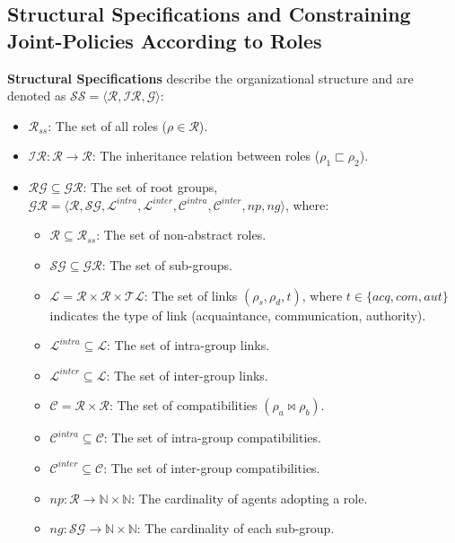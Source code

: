 \documentclass[conference]{IEEEtran}
\newcounter{relation}
\begin{document}
\subsection{Structural Specifications and Constraining Joint-Policies According to Roles}

\textbf{Structural Specifications} describe the organizational structure and are denoted as $\mathcal{SS} = \langle \mathcal{R}, \mathcal{IR}, \mathcal{G} \rangle$:

\begin{itemize}
    \item $\mathcal{R}_{ss}$: The set of all roles ($\rho \in \mathcal{R}$).
    \item $\mathcal{IR}: \mathcal{R} \rightarrow \mathcal{R}$: The inheritance relation between roles ($\rho_1 \sqsubset \rho_2$).
    \item $\mathcal{RG} \subseteq \mathcal{GR}$: The set of root groups, $\mathcal{GR} = \langle \mathcal{R}, \mathcal{SG}, \mathcal{L}^{intra}, \mathcal{L}^{inter}, \mathcal{C}^{intra}, \mathcal{C}^{inter}, \allowbreak np, ng \rangle$, where:
          \begin{itemize}
          \item $\mathcal{R} \subseteq \mathcal{R}_{ss}$: The set of non-abstract roles.
          \item $\mathcal{SG} \subseteq \mathcal{GR}$: The set of sub-groups.
          \item $\mathcal{L} = \mathcal{R} \times \mathcal{R} \times \mathcal{TL}$: The set of links $(\rho_s, \rho_d, t)$, where $t \in \{acq, com, aut\}$ indicates the type of link (acquaintance, communication, authority).
          \item $\mathcal{L}^{intra} \subseteq \mathcal{L}$: The set of intra-group links.
          \item $\mathcal{L}^{inter} \subseteq \mathcal{L}$: The set of inter-group links.
          \item $\mathcal{C} = \mathcal{R} \times \mathcal{R}$: The set of compatibilities $(\rho_a \bowtie \rho_b)$.
          \item $\mathcal{C}^{intra} \subseteq \mathcal{C}$: The set of intra-group compatibilities.
          \item $\mathcal{C}^{inter} \subseteq \mathcal{C}$: The set of inter-group compatibilities.
          \item $np: \mathcal{R} \rightarrow \mathbb{N} \times \mathbb{N}$: The cardinality of agents adopting a role.
          \item $ng: \mathcal{SG} \rightarrow \mathbb{N} \times \mathbb{N}$: The cardinality of each sub-group.
          \end{itemize}
\end{itemize}
\end{document}
